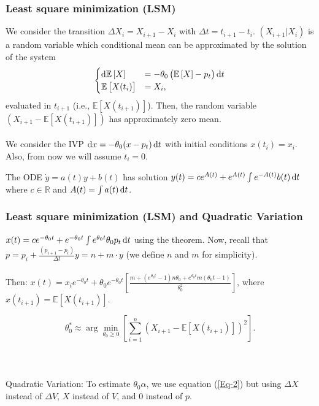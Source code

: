 \documentclass[aspectratio=169]{beamer}\usepackage[utf8]{inputenc}
\newcommand{\R}{\mathbb{R}}
\newcommand{\E}{\mathbb{E}}
\begin{document}

\begin{frame}\frametitle{Least square minimization (LSM)}

We consider the transition $\Delta X_i=X_{i+1}-X_i$ with $\Delta t=t_{i+1}-t_i$. $(X_{i+1}|X_i)$ is a random variable which conditional mean can be approximated by the solution of the system
\begin{equation*}
\begin{cases}
\dif \E\left[X\right]&=-\theta_0\left(\E\left[X\right]-p_t\right)\dif t\\
\E\left[X(t_i)\right]&=X_i,
\end{cases}
\end{equation*}
evaluated in $t_{i+1}$ (i.e., $\E\left[X(t_{i+1})\right]$). Then, the random variable $(X_{i+1}-\E\left[X(t_{i+1})\right])$ has approximately zero mean.\\
\quad\\
We consider the IVP $\dif x=-\theta_0(x-p_t)\dif t$ with initial conditions $x(t_i)=x_i$. Also, from now we will assume $t_i=0$.
\begin{theorem}
The ODE $\dot{y}=a(t)y+b(t)$ has solution $y(t)=ce^{A(t)}+e^{A(t)}\int e^{-A(t)}b(t)\dif t$ where $c\in\R$ and $A(t)=\int a(t)\dif t$.
\end{theorem}

\end{frame}


\begin{frame}\frametitle{Least square minimization (LSM) and Quadratic Variation}

$x(t)=ce^{-\theta_0 t}+e^{-\theta_0 t}\int e^{\theta_0 t}\theta_0p_t\dif t$ using the theorem. Now, recall that $p=p_i+\frac{(p_{i+1}-p_i)}{\Delta t}y=n+m\cdot y$ (we define $n$ and $m$ for simplicity).\\
\quad\\
Then: $x(t)=x_ie^{-\theta_0t}+\theta_0e^{-\theta_0t}\left[\frac{m+(e^{\theta_0t}-1)n\theta_0+e^{\theta_0t}m(\theta_0t-1)}{\theta_0^2}\right]$, where $x(t_{i+1})=\E\left[X(t_{i+1})\right]$.

\begin{equation*}
\theta_0^*\approx\arg\min_{\theta_0\geq0}\left[\sum_{i=1}^n\left(X_{i+1}-\E\left[X(t_{i+1})\right]\right)^2\right].
\end{equation*}\\
\quad\\
\quad\\
Quadratic Variation: To estimate $\theta_0\alpha$, we use equation (\ref{Eq-2}) but using $\Delta X$ instead of $\Delta V$, $X$ instead of $V$, and $0$ instead of $p$.

\end{frame}
\end{document}
